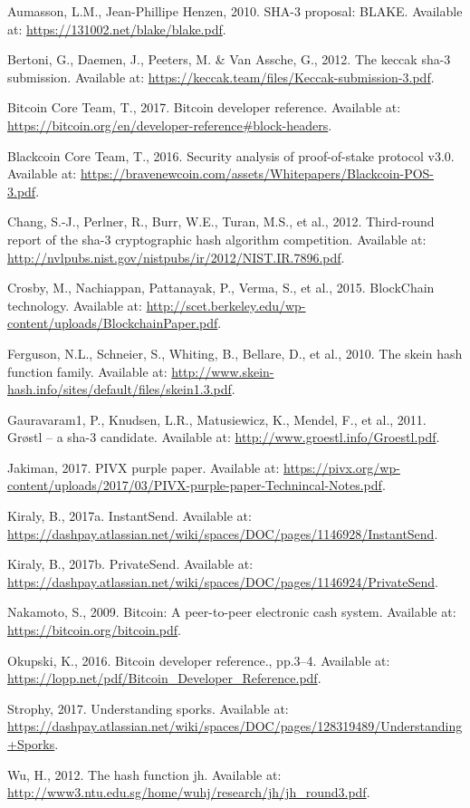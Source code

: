 \documentclass[11pt,a4paperpaper,]{report}
\begin{document}
\hypertarget{refs}{}
\hypertarget{ref-Blake}{}
Aumasson, L.M., Jean-Phillipe Henzen, 2010. SHA-3 proposal: BLAKE.
Available at: \url{https://131002.net/blake/blake.pdf}.

\hypertarget{ref-Keccak}{}
Bertoni, G., Daemen, J., Peeters, M. \& Van Assche, G., 2012. The keccak
sha-3 submission. Available at:
\url{https://keccak.team/files/Keccak-submission-3.pdf}.

\hypertarget{ref-Bitcoindev}{}
Bitcoin Core Team, T., 2017. Bitcoin developer reference. Available at:
\url{https://bitcoin.org/en/developer-reference\#block-headers}.

\hypertarget{ref-Blackcoin}{}
Blackcoin Core Team, T., 2016. Security analysis of proof-of-stake
protocol v3.0. Available at:
\url{https://bravenewcoin.com/assets/Whitepapers/Blackcoin-POS-3.pdf}.

\hypertarget{ref-NIST}{}
Chang, S.-J., Perlner, R., Burr, W.E., Turan, M.S., et al., 2012.
Third-round report of the sha-3 cryptographic hash algorithm
competition. Available at:
\url{http://nvlpubs.nist.gov/nistpubs/ir/2012/NIST.IR.7896.pdf}.

\hypertarget{ref-Crosby}{}
Crosby, M., Nachiappan, Pattanayak, P., Verma, S., et al., 2015.
BlockChain technology. Available at:
\url{http://scet.berkeley.edu/wp-content/uploads/BlockchainPaper.pdf}.

\hypertarget{ref-Skein}{}
Ferguson, N.L., Schneier, S., Whiting, B., Bellare, D., et al., 2010.
The skein hash function family. Available at:
\url{http://www.skein-hash.info/sites/default/files/skein1.3.pdf}.

\hypertarget{ref-Grostl}{}
Gauravaram1, P., Knudsen, L.R., Matusiewicz, K., Mendel, F., et al.,
2011. Grøstl -- a sha-3 candidate. Available at:
\url{http://www.groestl.info/Groestl.pdf}.

\hypertarget{ref-PIVX}{}
Jakiman, 2017. PIVX purple paper. Available at:
\url{https://pivx.org/wp-content/uploads/2017/03/PIVX-purple-paper-Technincal-Notes.pdf}.

\hypertarget{ref-InstantSend}{}
Kiraly, B., 2017a. InstantSend. Available at:
\url{https://dashpay.atlassian.net/wiki/spaces/DOC/pages/1146928/InstantSend}.

\hypertarget{ref-PrivateSend}{}
Kiraly, B., 2017b. PrivateSend. Available at:
\url{https://dashpay.atlassian.net/wiki/spaces/DOC/pages/1146924/PrivateSend}.

\hypertarget{ref-Bitcoin}{}
Nakamoto, S., 2009. Bitcoin: A peer-to-peer electronic cash system.
Available at: \url{https://bitcoin.org/bitcoin.pdf}.

\hypertarget{ref-Bitcoindevreference}{}
Okupski, K., 2016. Bitcoin developer reference., pp.3--4. Available at:
\url{https://lopp.net/pdf/Bitcoin_Developer_Reference.pdf}.

\hypertarget{ref-Sporks}{}
Strophy, 2017. Understanding sporks. Available at:
\url{https://dashpay.atlassian.net/wiki/spaces/DOC/pages/128319489/Understanding+Sporks}.

\hypertarget{ref-JH}{}
Wu, H., 2012. The hash function jh. Available at:
\url{http://www3.ntu.edu.sg/home/wuhj/research/jh/jh_round3.pdf}.
\end{document}
